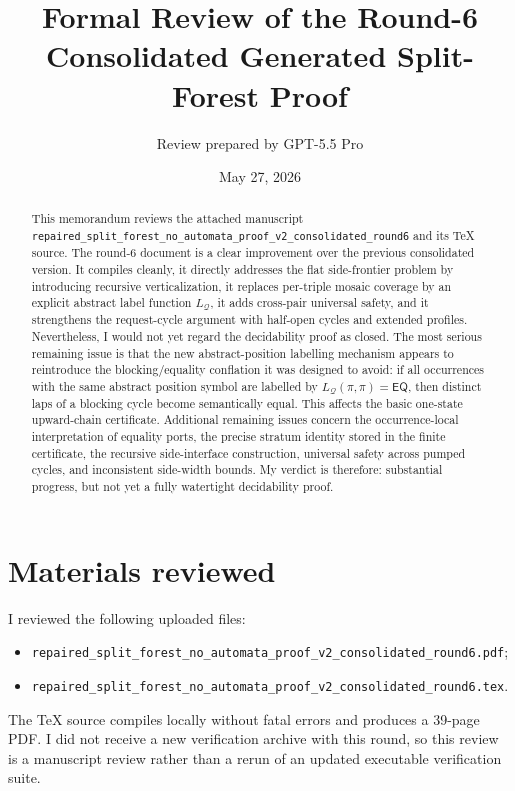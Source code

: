 \documentclass[11pt]{article}
\title{Formal Review of the Round-6 Consolidated Generated Split-Forest Proof}
\author{Review prepared by GPT-5.5 Pro}
\date{May 27, 2026}
\newcommand{\EQ}{\mathsf{EQ}}
\newcommand{\Q}{\mathcal Q}
\begin{document}
\sloppy
\maketitle

\begin{abstract}
This memorandum reviews the attached manuscript
\texttt{repaired\_split\_forest\_no\_automata\_proof\_v2\_consolidated\_round6}
and its TeX source.  The round-6 document is a clear improvement over the
previous consolidated version.  It compiles cleanly, it directly addresses the
flat side-frontier problem by introducing recursive verticalization, it replaces
per-triple mosaic coverage by an explicit abstract label function $L_{\Q}$, it
adds cross-pair universal safety, and it strengthens the request-cycle argument
with half-open cycles and extended profiles.  Nevertheless, I would not yet
regard the decidability proof as closed.  The most serious remaining issue is
that the new abstract-position labelling mechanism appears to reintroduce the
blocking/equality conflation it was designed to avoid: if all occurrences with
the same abstract position symbol are labelled by $L_{\Q}(\pi,\pi)=\EQ$, then
distinct laps of a blocking cycle become semantically equal.  This affects the
basic one-state upward-chain certificate.  Additional remaining issues concern
the occurrence-local interpretation of equality ports, the precise stratum
identity stored in the finite certificate, the recursive side-interface
construction, universal safety across pumped cycles, and inconsistent side-width
bounds.  My verdict is therefore: substantial progress, but not yet a fully
watertight decidability proof.
\end{abstract}

\tableofcontents

\section{Materials reviewed}

I reviewed the following uploaded files:
\begin{itemize}[leftmargin=2em]
  \item \texttt{repaired\_split\_forest\_no\_automata\_proof\_v2\_consolidated\_round6.pdf};
  \item \texttt{repaired\_split\_forest\_no\_automata\_proof\_v2\_consolidated\_round6.tex}.
\end{itemize}
The TeX source compiles locally without fatal errors and produces a 39-page PDF.
I did not receive a new verification archive with this round, so this review is
a manuscript review rather than a rerun of an updated executable verification
suite.
\end{document}
